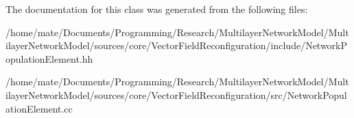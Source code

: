 The documentation for this class was generated from the following files\+:\begin{DoxyCompactItemize}
\item 
/home/mate/\+Documents/\+Programming/\+Research/\+Multilayer\+Network\+Model/\+Multilayer\+Network\+Model/sources/core/\+Vector\+Field\+Reconfiguration/include/Network\+Population\+Element.\+hh\item 
/home/mate/\+Documents/\+Programming/\+Research/\+Multilayer\+Network\+Model/\+Multilayer\+Network\+Model/sources/core/\+Vector\+Field\+Reconfiguration/src/Network\+Population\+Element.\+cc\end{DoxyCompactItemize}
